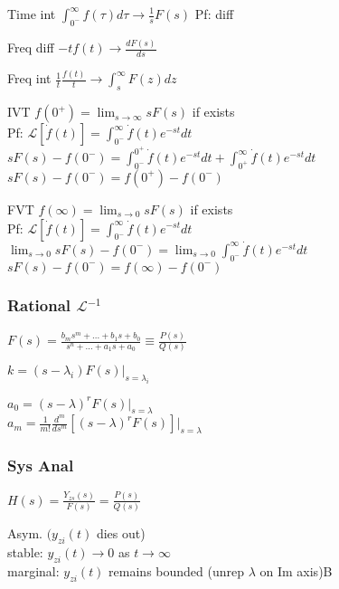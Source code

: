 \documentclass[4pt]{article}
\theoremstyle{definition}
\theoremstyle{definition}
\newcommand{\ra}{\rightarrow}
\newcommand{\ulint}{\int_{0^-}^{\infty}}    %
\begin{document}
    Time int \(\ulint f(\tau) d\tau \ra \frac{1}{s} F(s)\) Pf: diff     %

    Freq diff \(-t f(t) \ra \frac{dF(s)}{ds}\)          %

    Freq int \(\frac{1}{t}\frac{f(t)}{t} \ra \int_s^{\infty}F(z) dz\)

    IVT \(f(0^+) = \lim_{s\ra \infty} sF(s)\) if exists\\
        Pf: \(\mathcal L[\dot{f} (t)] = \ulint \dot f(t) e^{-st} dt\)\\ %
        \(sF(s) - f(0^-) = \int_{0^-}^{0^+} \dot f (t) e^{-st} dt + \int _{0^+}^{\infty} \dot f(t) e^{-st} dt \)\\    %
        \(sF(s) - f(0^-) = f(0^+) - f(0^-)\)    %

    FVT \(f(\infty) = \lim_{s\ra 0} sF(s)\) if exists\\
        Pf: \(\mathcal L[\dot{f} (t)] = \ulint \dot f(t) e^{-st} dt\)\\ %
        \(\lim_{s\ra 0} sF(s) - f(0^-) = \lim_{s\ra 0}\ulint \dot f (t) e^{-st} dt\)\\    %
        \(sF(s) - f(0^-) = f(\infty) - f(0^-)\)    %


\subsubsection{Rational $\mathcal L^{-1}$}
    \(F(s) = \frac{b_ms^m + ... + b_1s + b_0}{s^n + ... + a_1s + a_0} \equiv \frac{P(s)}{Q(s)}\)

    \(k = (s-\lambda_i) F(s) | _{s = \lambda_i}\)

    \(a_0 = (s-\lambda)^r F(s)|_{s=\lambda}\)\\
    \(a_m = \frac{1}{m!} \frac{d^m}{ds^m}[(s-\lambda)^r F(s)] |_{s = \lambda}\)

\subsubsection{Sys Anal}
    $H(s) = \frac{Y_{zs}(s)}{F(s)} = \frac{P(s)}{Q(s)}$  %

    Asym. $(y_{zi} (t)$ dies out)\\         %
    stable: $y_{zi}(t) \ra 0$ as $t\ra \infty$\\
    marginal: $y_{zi}(t)$ remains bounded (unrep $\lambda$ on Im axis)B
\end{document}
